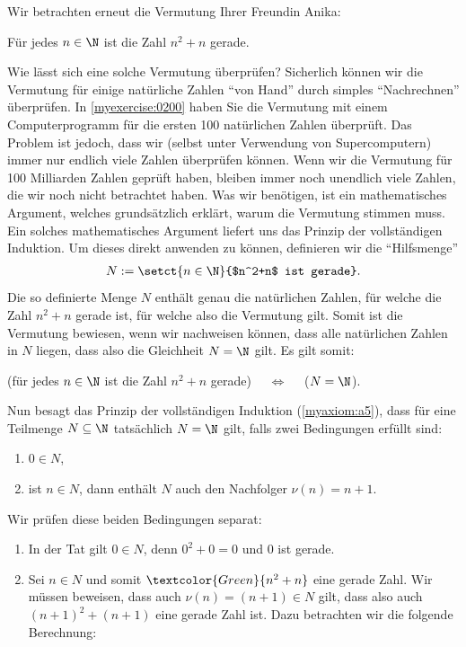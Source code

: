 \begin{myexample}\label{myexample:InduktionEven}
Wir betrachten erneut die Vermutung Ihrer Freundin Anika:
\begin{center}
	Für jedes $n\in\N$ ist die Zahl $n^2+n$ gerade.
\end{center}
Wie lässt sich eine solche Vermutung überprüfen? Sicherlich können wir die Vermutung für einige natürliche Zahlen \enquote{von Hand} durch simples \enquote{Nachrechnen} überprüfen. In \cref{myexercise:0200} haben Sie die Vermutung mit einem Computerprogramm für die ersten 100 natürlichen Zahlen überprüft. Das Problem ist jedoch, dass wir (selbst unter Verwendung von Supercomputern) immer nur endlich viele Zahlen überprüfen können. Wenn wir die Vermutung für 100 Milliarden Zahlen geprüft haben, bleiben immer noch unendlich viele Zahlen, die wir noch nicht betrachtet haben. Was wir benötigen, ist ein mathematisches Argument, welches grundsätzlich erklärt, warum die Vermutung stimmen muss. Ein solches mathematisches Argument liefert uns das Prinzip der vollständigen Induktion. Um dieses direkt anwenden zu können, definieren wir die \enquote{Hilfsmenge}
\begin{align*}
	N:=\setct{n\in\N}{$n^2+n$ ist gerade}.
\end{align*}
Die so definierte Menge $N$ enthält genau die natürlichen Zahlen, für welche die Zahl $n^2+n$ gerade ist, für welche also die Vermutung gilt. Somit ist die Vermutung bewiesen, wenn wir nachweisen können, dass alle natürlichen Zahlen in $N$ liegen, dass also die Gleichheit $N=\N$ gilt. Es gilt somit:
\begin{center}
	(für jedes $n\in\N$ ist die Zahl $n^2+n$ gerade) $\quad\iff\quad$ ($N = \N$).
\end{center}
Nun besagt das Prinzip der vollständigen Induktion (\cref{myaxiom:a5}), dass für eine Teilmenge $N\subseteq\N$ tatsächlich $N=\N$ gilt, falls zwei Bedingungen erfüllt sind:
\begin{enumerate}
	\item $0\in N$,
	\item ist $n\in N$, dann enthält $N$ auch den Nachfolger $\nu(n) = n+1$.
\end{enumerate}
Wir prüfen diese beiden Bedingungen separat:
\begin{enumerate}
	\item In der Tat gilt $0\in N$, denn $0^2+0 = 0$ und $0$ ist gerade. \checkmark
	\item Sei $n\in N$ und somit $\textcolor{Green}{n^2+n}$ eine gerade Zahl. Wir müssen beweisen, dass auch $\nu(n)=(n+1)\in N$ gilt, dass also auch $(n+1)^2+(n+1)$ eine gerade Zahl ist. Dazu betrachten wir die folgende Berechnung:

\end{enumerate}
\end{myexample}
